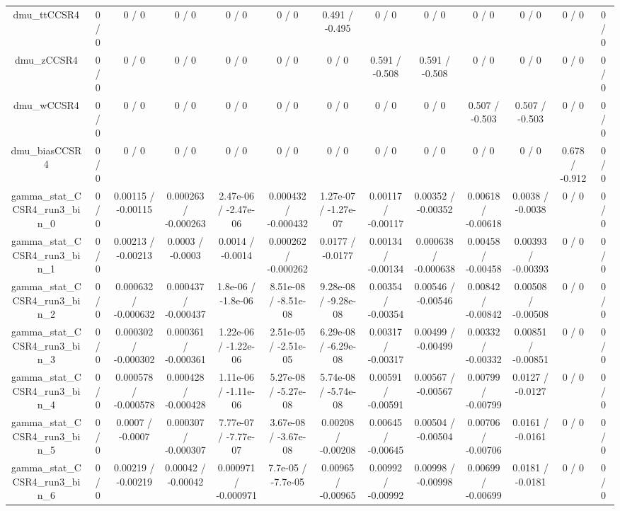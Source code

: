 \documentclass[10pt]{article}
\begin{document}
\begin{table}[htbp]
\begin{center}
\begin{tabular}{|c|c|c|c|c|c|c|c|c|c|c|c|c|}
  dmu_ttCCSR4 & 0 / 0 & 0 / 0 & 0 / 0 & 0 / 0 & 0 / 0 & 0.491 / -0.495 & 0 / 0 & 0 / 0 & 0 / 0 & 0 / 0 & 0 / 0 & 0 / 0 \\ 
  dmu_zCCSR4 & 0 / 0 & 0 / 0 & 0 / 0 & 0 / 0 & 0 / 0 & 0 / 0 & 0.591 / -0.508 & 0.591 / -0.508 & 0 / 0 & 0 / 0 & 0 / 0 & 0 / 0 \\ 
  dmu_wCCSR4 & 0 / 0 & 0 / 0 & 0 / 0 & 0 / 0 & 0 / 0 & 0 / 0 & 0 / 0 & 0 / 0 & 0.507 / -0.503 & 0.507 / -0.503 & 0 / 0 & 0 / 0 \\ 
  dmu_biasCCSR4 & 0 / 0 & 0 / 0 & 0 / 0 & 0 / 0 & 0 / 0 & 0 / 0 & 0 / 0 & 0 / 0 & 0 / 0 & 0 / 0 & 0.678 / -0.912 & 0 / 0 \\ 
  gamma_stat_CCSR4_run3_bin_0 & 0 / 0 & 0.00115 / -0.00115 & 0.000263 / -0.000263 & 2.47e-06 / -2.47e-06 & 0.000432 / -0.000432 & 1.27e-07 / -1.27e-07 & 0.00117 / -0.00117 & 0.00352 / -0.00352 & 0.00618 / -0.00618 & 0.0038 / -0.0038 & 0 / 0 & 0 / 0 \\ 
  gamma_stat_CCSR4_run3_bin_1 & 0 / 0 & 0.00213 / -0.00213 & 0.0003 / -0.0003 & 0.0014 / -0.0014 & 0.000262 / -0.000262 & 0.0177 / -0.0177 & 0.00134 / -0.00134 & 0.000638 / -0.000638 & 0.00458 / -0.00458 & 0.00393 / -0.00393 & 0 / 0 & 0 / 0 \\ 
  gamma_stat_CCSR4_run3_bin_2 & 0 / 0 & 0.000632 / -0.000632 & 0.000437 / -0.000437 & 1.8e-06 / -1.8e-06 & 8.51e-08 / -8.51e-08 & 9.28e-08 / -9.28e-08 & 0.00354 / -0.00354 & 0.00546 / -0.00546 & 0.00842 / -0.00842 & 0.00508 / -0.00508 & 0 / 0 & 0 / 0 \\ 
  gamma_stat_CCSR4_run3_bin_3 & 0 / 0 & 0.000302 / -0.000302 & 0.000361 / -0.000361 & 1.22e-06 / -1.22e-06 & 2.51e-05 / -2.51e-05 & 6.29e-08 / -6.29e-08 & 0.00317 / -0.00317 & 0.00499 / -0.00499 & 0.00332 / -0.00332 & 0.00851 / -0.00851 & 0 / 0 & 0 / 0 \\ 
  gamma_stat_CCSR4_run3_bin_4 & 0 / 0 & 0.000578 / -0.000578 & 0.000428 / -0.000428 & 1.11e-06 / -1.11e-06 & 5.27e-08 / -5.27e-08 & 5.74e-08 / -5.74e-08 & 0.00591 / -0.00591 & 0.00567 / -0.00567 & 0.00799 / -0.00799 & 0.0127 / -0.0127 & 0 / 0 & 0 / 0 \\ 
  gamma_stat_CCSR4_run3_bin_5 & 0 / 0 & 0.0007 / -0.0007 & 0.000307 / -0.000307 & 7.77e-07 / -7.77e-07 & 3.67e-08 / -3.67e-08 & 0.00208 / -0.00208 & 0.00645 / -0.00645 & 0.00504 / -0.00504 & 0.00706 / -0.00706 & 0.0161 / -0.0161 & 0 / 0 & 0 / 0 \\ 
  gamma_stat_CCSR4_run3_bin_6 & 0 / 0 & 0.00219 / -0.00219 & 0.00042 / -0.00042 & 0.000971 / -0.000971 & 7.7e-05 / -7.7e-05 & 0.00965 / -0.00965 & 0.00992 / -0.00992 & 0.00998 / -0.00998 & 0.00699 / -0.00699 & 0.0181 / -0.0181 & 0 / 0 & 0 / 0 \\ 

\end{tabular}
\end{center}
\end{table}
\end{document}
